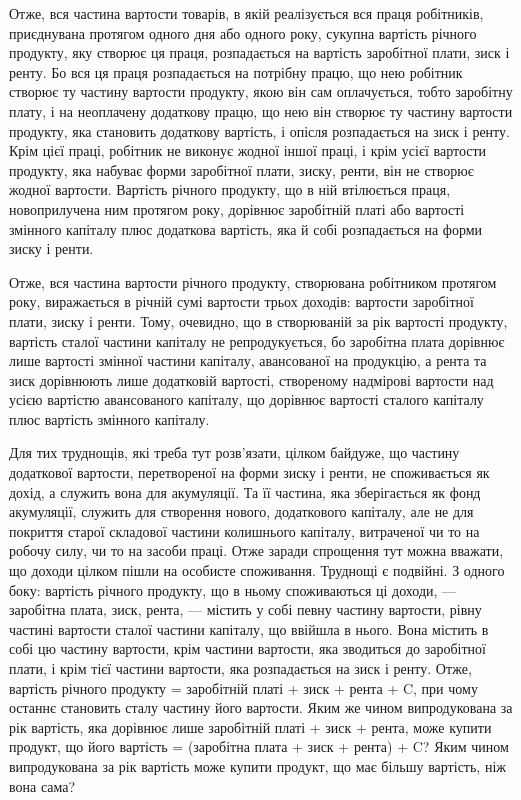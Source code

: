 
Отже, вся частина вартости товарів, в якій реалізується вся праця робітників,
приєднувана протягом одного дня або одного року, сукупна вартість річного
продукту, яку створює ця праця, розпадається на вартість заробітної плати,
зиск і ренту. Бо вся ця праця розпадається на потрібну працю, що нею робітник
створює ту частину вартости продукту, якою він сам оплачується, тобто заробітну
плату, і на неоплачену додаткову працю, що нею він створює ту частину
вартости продукту, яка становить додаткову вартість, і опісля розпадається на
зиск і ренту. Крім цієї праці, робітник не виконує жодної іншої праці, і крім
усієї вартости продукту, яка набуває форми заробітної плати, зиску, ренти, він
не створює жодної вартости. Вартість річного продукту, що в ній втілюється праця,
новоприлучена ним протягом року, дорівнює заробітній платі або вартості змінного
капіталу плюс додаткова вартість, яка й собі розпадається на форми зиску
і ренти.

Отже, вся частина вартости річного продукту, створювана робітником протягом
року, виражається в річній сумі вартости трьох доходів: вартости заробітної
плати, зиску і ренти. Тому, очевидно, що в створюваній за рік вартості
продукту, вартість сталої частини капіталу не репродукується, бо заробітна
плата дорівнює лише вартості змінної частини капіталу, авансованої на продукцію,
а рента та зиск дорівнюють лише додатковій вартості, створеному надмірові
вартости над усією вартістю авансованого капіталу, що дорівнює вартості
сталого капіталу плюс вартість змінного капіталу.

Для тих труднощів, які треба тут розв’язати, цілком байдуже, що частину
додаткової вартости, перетвореної на форми зиску і ренти, не споживається як
дохід, а служить вона для акумуляції. Та її частина, яка зберігається як фонд акумуляції, служить
для створення нового, додаткового капіталу, але не для покриття
старої складової частини колишнього капіталу, витраченої чи то на
робочу силу, чи то на засоби праці. Отже заради спрощення тут можна вважати,
що доходи цілком пішли на особисте споживання. Труднощі є подвійні.
З одного боку: вартість річного продукту, що в ньому споживаються ці
доходи, — заробітна плата, зиск, рента, — містить у собі певну частину вартости,
рівну частині вартости сталої частини капіталу, що ввійшла в нього. Вона містить
в собі цю частину вартости, крім частини вартости, яка зводиться до заробітної
плати, і крім тієї частини вартости, яка розпадається на зиск і ренту. Отже,
вартість річного продукту = заробітній платі + зиск + рента + C, при чому
останнє становить сталу частину його вартости. Яким же чином випродукована
за рік вартість, яка дорівнює лише заробітній платі + зиск + рента, може
купити продукт, що його вартість = (заробітна плата + зиск + рента) + C?
Яким чином випродукована за рік вартість може купити продукт, що має
більшу вартість, ніж вона сама?

